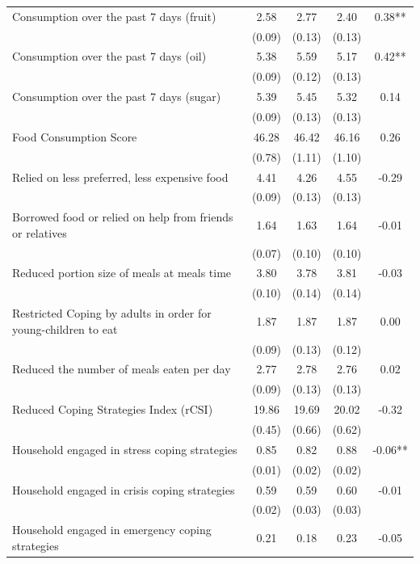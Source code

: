 \begin{tabular}{@{\extracolsep{5pt}}lcccc}
Consumption over the past 7 days (fruit)   & 2.58    & 2.77    & 2.40    & 0.38**   \\
 & (0.09)  & (0.13)  & (0.13)  &  \\ [1ex]
Consumption over the past 7 days (oil)   & 5.38    & 5.59    & 5.17    & 0.42**   \\
 & (0.09)  & (0.12)  & (0.13)  &  \\ [1ex]
Consumption over the past 7 days (sugar)   & 5.39    & 5.45    & 5.32    & 0.14   \\
 & (0.09)  & (0.13)  & (0.13)  &  \\ [1ex]
Food Consumption Score   & 46.28    & 46.42    & 46.16    & 0.26   \\
 & (0.78)  & (1.11)  & (1.10)  &  \\ [1ex]
Relied on less preferred, less expensive food   & 4.41    & 4.26    & 4.55    & -0.29   \\
 & (0.09)  & (0.13)  & (0.13)  &  \\ [1ex]
Borrowed food or relied on help from friends or relatives   & 1.64    & 1.63    & 1.64    & -0.01   \\
 & (0.07)  & (0.10)  & (0.10)  &  \\ [1ex]
Reduced portion size of meals at meals time   & 3.80    & 3.78    & 3.81    & -0.03   \\
 & (0.10)  & (0.14)  & (0.14)  &  \\ [1ex]
Restricted Coping by adults in order for young-children to eat   & 1.87    & 1.87    & 1.87    & 0.00   \\
 & (0.09)  & (0.13)  & (0.12)  &  \\ [1ex]
Reduced the number of meals eaten per day   & 2.77    & 2.78    & 2.76    & 0.02   \\
 & (0.09)  & (0.13)  & (0.13)  &  \\ [1ex]
Reduced Coping Strategies Index (rCSI)   & 19.86    & 19.69    & 20.02    & -0.32   \\
 & (0.45)  & (0.66)  & (0.62)  &  \\ [1ex]
Household engaged in stress coping strategies   & 0.85    & 0.82    & 0.88    & -0.06**   \\
 & (0.01)  & (0.02)  & (0.02)  &  \\ [1ex]
Household engaged in crisis coping strategies   & 0.59    & 0.59    & 0.60    & -0.01   \\
 & (0.02)  & (0.03)  & (0.03)  &  \\ [1ex]
Household engaged in emergency coping strategies   & 0.21    & 0.18    & 0.23    & -0.05   \\

\end{tabular}
